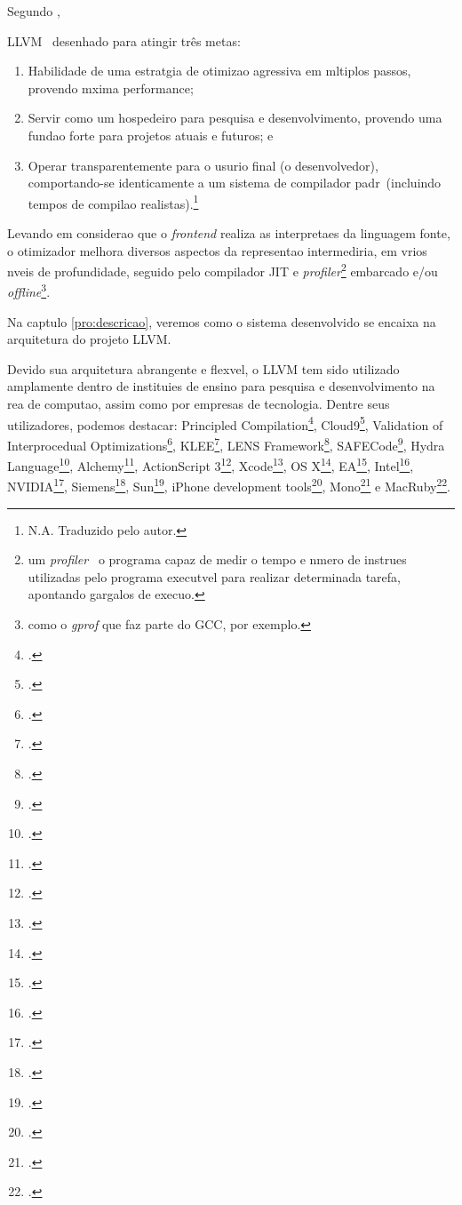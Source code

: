 Segundo \cite{Lattner02},
\begin{citacao}
  LLVM \eh\ desenhado para atingir tr\^es metas:
  \begin{enumerate}
    \item Habilidade de uma estrat\eh gia de otimiza\ca o agressiva em m\uh ltiplos passos, provendo m\ah xima performance;
    \item Servir como um hospedeiro para pesquisa e desenvolvimento, provendo uma funda\ca o forte para projetos atuais e futuros; e
    \item Operar transparentemente para o usu\ah rio final (o desenvolvedor), comportando-se identicamente a um sistema de compilador padr\ao\ (incluindo tempos de compila\ca o realistas).\footnote{N.A. Traduzido pelo autor.}
  \end{enumerate}
\end{citacao}
Levando em considera\ca o que o \emph{frontend} realiza as interpreta\co es da linguagem fonte, o otimizador melhora diversos aspectos da representa\ca o intermedi\ah ria, em v\ah rios n\ih veis de profundidade, seguido pelo compilador JIT e \emph{profiler}\footnote{um \emph{profiler} \eh\ o programa capaz de medir o tempo e n\uh mero de instru\co es utilizadas pelo programa execut\ah vel para realizar determinada tarefa, apontando gargalos de execu\ca o.} embarcado e/ou \emph{offline}\footnote{como o \emph{gprof} que faz parte do GCC, por exemplo.}.

Na cap\ih tulo \ref{pro:descricao}, veremos como o sistema desenvolvido se encaixa na arquitetura do projeto LLVM.

Devido sua arquitetura abrangente e flex\ih vel, o LLVM tem sido utilizado amplamente dentro de institui\co es de ensino para pesquisa e desenvolvimento na \ah rea de computa\ca o, assim como por empresas de tecnologia. Dentre seus utilizadores, podemos destacar: Principled Compilation\footnote{\cite{Carnegie}.}, Cloud9\footnote{\cite{Ecole}.}, Validation of Interprocedual Optimizations\footnote{\cite{NewYork}.}, KLEE\footnote{\cite{Stanford}.}, LENS Framework\footnote{\cite{California}.}, SAFECode\footnote{\cite{Illinois}.}, Hydra Language\footnote{\cite{Adobe1}.}, Alchemy\footnote{\cite{Adobe2}.}, ActionScript 3\footnote{\cite{Adobe3}.}, Xcode\footnote{\cite{Apple1}.}, OS X\footnote{\cite{Apple2}.}, EA\footnote{\cite{EA}.}, Intel\footnote{\cite{Intel}.}, NVIDIA\footnote{\cite{NVIDIA}.}, Siemens\footnote{\cite{Siemens}.}, Sun\footnote{\cite{Sun}.}, iPhone development tools\footnote{\cite{iPhoneDev}.}, Mono\footnote{\cite{Mono}.} e MacRuby\footnote{\cite{MacRuby}.}.

